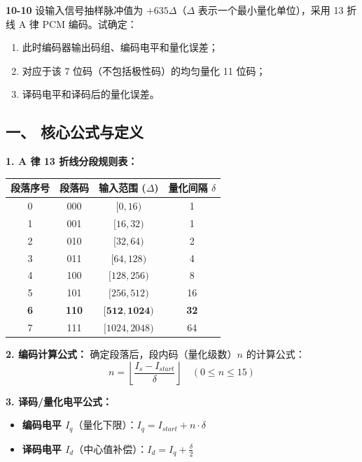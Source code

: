 \documentclass[a4paper,11pt]{ctexart}
\begin{document}
\noindent \textbf{10-10} 设输入信号抽样脉冲值为 $+635\Delta$（$\Delta$ 表示一个最小量化单位），采用 13 折线 A 律 PCM 编码。试确定：
\begin{enumerate}[label=(\arabic*)]
    \item 此时编码器输出码组、编码电平和量化误差；
    \item 对应于该 7 位码（不包括极性码）的均匀量化 11 位码；
    \item 译码电平和译码后的量化误差。
\end{enumerate}%
\begin{tcolorbox}[colback=white, colframe=blue!50!black, title=\textbf{题目解答：10-10 A 律 13 折线 PCM 编码计算}]

    \section*{一、 核心公式与定义}
    
    \textbf{1. A 律 13 折线分段规则表：}
    \begin{center}
    \small
    \begin{tabular}{|c|c|c|c|}
    \hline
    \textbf{段落序号} & \textbf{段落码} & \textbf{输入范围 ($\Delta$)} & \textbf{量化间隔 $\delta$} \\ \hline
    0 & 000 & $[0, 16)$ & 1 \\ \hline
    1 & 001 & $[16, 32)$ & 1 \\ \hline
    2 & 010 & $[32, 64)$ & 2 \\ \hline
    3 & 011 & $[64, 128)$ & 4 \\ \hline
    4 & 100 & $[128, 256)$ & 8 \\ \hline
    5 & 101 & $[256, 512)$ & 16 \\ \hline
    \textbf{6} & \textbf{110} & $\mathbf{[512, 1024)}$ & \textbf{32} \\ \hline
    7 & 111 & $[1024, 2048)$ & 64 \\ \hline
    \end{tabular}
    \end{center}

    \textbf{2. 编码计算公式：}
    确定段落后，段内码（量化级数）$n$ 的计算公式：
    \begin{equation}
        n = \left\lfloor \frac{I_s - I_{start}}{\delta} \right\rfloor \quad (0 \le n \le 15)
    \end{equation}
    
    \textbf{3. 译码/量化电平公式：}
    \begin{itemize}
        \item \textbf{编码电平 $I_q$}（量化下限）：$I_q = I_{start} + n \cdot \delta$
        \item \textbf{译码电平 $I_d$}（中心值补偿）：$I_d = I_q + \frac{\delta}{2}$
    \end{itemize}

    \end{tcolorbox}
\end{document}

